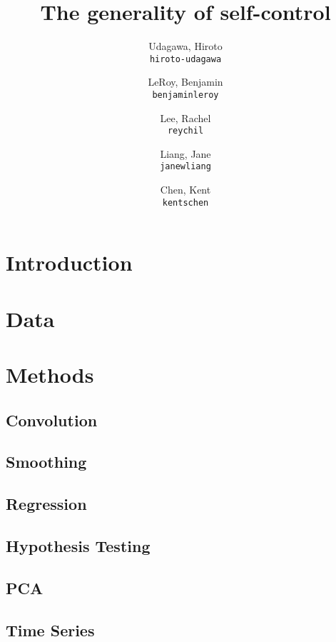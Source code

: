 \documentclass[11pt]{article}
\title{The generality of self-control}
\author{
  Udagawa, Hiroto\\
  \texttt{hiroto-udagawa}
  \and
  LeRoy, Benjamin\\
  \texttt{benjaminleroy}
  \and
  Lee, Rachel\\
  \texttt{reychil}
  \and
  Liang, Jane\\
  \texttt{janewliang}
  \and
  Chen, Kent\\
  \texttt{kentschen}
}
\begin{document}
\maketitle

\abstract{}

\section{Introduction}
	

\section{Data}

	
	
\section{Methods}

	\subsection{Convolution}
		
	
	\subsection{Smoothing}
	
		
		
	\subsection{Regression}
	
		
		
	\subsection{Hypothesis Testing}
	
		
		
	\subsection{PCA}
	
		
		
	\subsection{Time Series}
	
\end{document}
